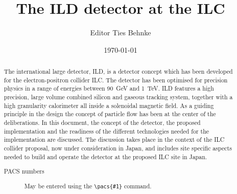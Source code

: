 \documentclass[%
 amsmath,amssymb,
 aps,
]{revtex4-1}
\begin{document}


\title{The ILD detector at the ILC}%

\author{Editor Ties Behnke}




\date{\today}%

\begin{abstract}
The international large detector, ILD, is a detector concept which has been developed for the electron-positron collider ILC. The detector has been optimised for precision physics in a range of energies between 90~GeV and 1~TeV. ILD features a high precision, large volume combined silicon and gaseous tracking system, together with a high granularity calorimeter all inside a solenoidal magnetic field. As a guiding principle in the design the concept of particle flow has been at the center of the deliberations. In this document, the concept of the detector, the proposed implementation and the readiness of the different technologies needed for the implementation are discussed. The discussion takes place in the context of the ILC collider proposal, now under consideration in Japan, and includes site specific aspects needed to build and operate the detector at the proposed ILC site in Japan.

\begin{description}
\item[PACS numbers]
May be entered using the \verb+\pacs{#1}+ command.
\end{description}
\end{abstract}
\end{document}
